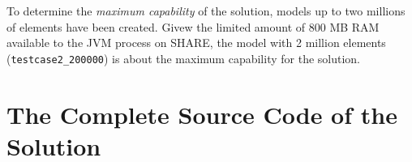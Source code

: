 \documentclass[submission]{eptcs}
\begin{document}
\begin{sloppypar}
  To determine the \emph{maximum capability} of the solution, models up to two
  millions of elements have been created.  Givew the limited amount of 800 MB
  RAM available to the JVM process on SHARE, the model with 2 million elements
  (\verb|testcase2_200000|) is about the maximum capability for the solution.
\end{sloppypar}

\FloatBarrier




\appendix
\newpage

\section{The Complete Source Code of the Solution}
\label{sec:complete-source-code}
\end{document}
